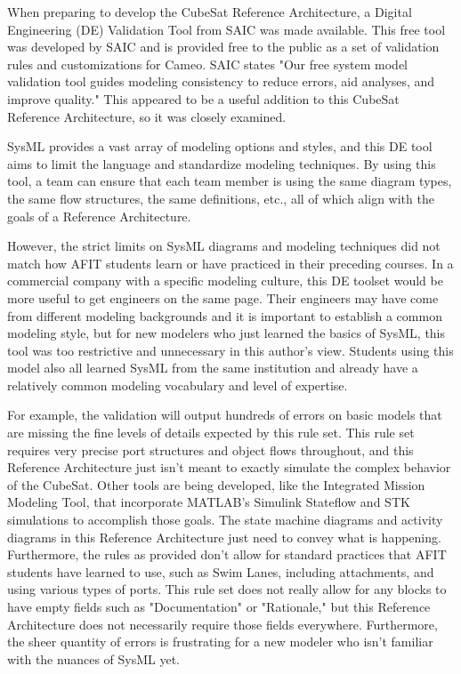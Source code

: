 When preparing to develop the CubeSat Reference Architecture, a Digital Engineering (DE) Validation Tool from SAIC was made available. This free tool was developed by SAIC and is provided free to the public as a set of validation rules and customizations for Cameo. SAIC states "Our free system model validation tool guides modeling consistency to reduce errors, aid analyses, and improve quality." This appeared to be a useful addition to this CubeSat Reference Architecture, so it was closely examined. 

SysML provides a vast array of modeling options and styles, and this DE tool aims to limit the language and standardize modeling techniques. By using this tool, a team can ensure that each team member is using the same diagram types, the same flow structures, the same definitions, etc., all of which align with the goals of a Reference Architecture. 

However, the strict limits on SysML diagrams and modeling techniques did not match how AFIT students learn or have practiced in their preceding courses. In a commercial company with a specific modeling culture, this DE toolset would be more useful to get engineers on the same page. Their engineers may have come from different modeling backgrounds and it is important to establish a common modeling style, but for new modelers who just learned the basics of SysML, this tool was too restrictive and unnecessary in this author's view. Students using this model also all learned SysML from the same institution and already have a relatively common modeling vocabulary and level of expertise. 

For example, the validation will output hundreds of errors on basic models that are missing the fine levels of details expected by this rule set. This rule set requires very precise port structures and object flows throughout, and this Reference Architecture just isn't meant to exactly simulate the complex behavior of the CubeSat. Other tools are being developed, like the Integrated Mission Modeling Tool, that incorporate MATLAB's Simulink Stateflow and STK simulations to accomplish those goals. The state machine diagrams and activity diagrams in this Reference Architecture just need to convey what is happening. Furthermore, the rules as provided don't allow for standard practices that AFIT students have learned to use, such as Swim Lanes, including attachments, and using various types of ports. This rule set does not really allow for any blocks to have empty fields such as "Documentation" or "Rationale," but this Reference Architecture does not necessarily require those fields everywhere. Furthermore, the sheer quantity of errors is frustrating for a new modeler who isn't familiar with the nuances of SysML yet. 

